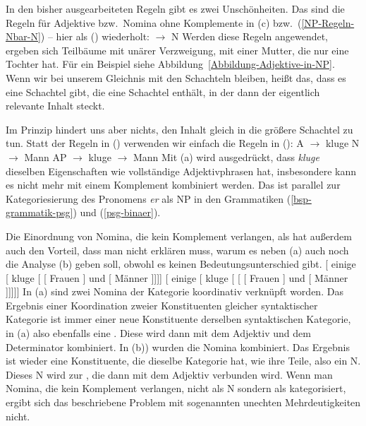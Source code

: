 
In den bisher ausgearbeiteten Regeln gibt es zwei Unschönheiten. Das sind die Regeln für Adjektive
bzw.\ Nomina ohne Komplemente in (c) bzw.\ (\ref{NP-Regeln-Nbar-N}) --  hier als () wiederholt:
\ea
\nbar $\to$ N
\z
Werden diese Regeln angewendet, ergeben sich Teilbäume mit unärer Verzweigung, \dash mit einer Mutter,
die nur eine Tochter hat. Für ein Beispiel siehe Abbildung~\ref{Abbildung-Adjektive-in-NP}. Wenn wir
bei unserem Gleichnis mit den Schachteln bleiben, heißt das, dass es eine Schachtel gibt, die eine
Schachtel enthält, in der dann der eigentlich relevante Inhalt steckt. 

Im Prinzip hindert uns aber nichts, den Inhalt gleich in die größere Schachtel zu tun. Statt der
Regeln in () verwenden wir einfach die Regeln in ():
\eal
\ex A $\to$ kluge
\ex N $\to$ Mann
\zl
\eal
\label{Lexikon-Projektion}
\ex AP $\to$ kluge
\ex \nbar $\to$ Mann
\zl
Mit (a) wird ausgedrückt, dass \emph{kluge} dieselben Eigenschaften wie vollständige
Adjektivphrasen hat, insbesondere kann es nicht mehr mit einem Komplement kombiniert werden. Das ist
parallel zur Kategoriesierung des Pronomens \emph{er} als NP in den Grammatiken
(\ref{bsp-grammatik-psg}) und (\ref{psg-binaer}).


Die Einordnung von Nomina, die kein Komplement verlangen, als \nbar hat außerdem auch den Vorteil,
dass man nicht erklären muss, warum es neben (a) auch noch die Analyse (b) geben soll, obwohl es
keinen Bedeutungsunterschied gibt.
\eal
\ex {}[ einige [\sub{\nbar} kluge [\sub{\nbar} [\sub{\nbar} Frauen ] und [\sub{\nbar} Männer
]]]]
\ex {}[ einige [\sub{\nbar} kluge [\sub{\nbar} [ [ Frauen ] und [ Männer
]]]]]
\zl
In (a) sind zwei Nomina der Kategorie \nbar koordinativ verknüpft worden. Das Ergebnis einer
Koordination zweier Konstituenten gleicher syntaktischer Kategorie ist immer einer neue Konstituente
derselben syntaktischen Kategorie, in (a) also ebenfalls eine \nbar. Diese wird dann mit dem
Adjektiv und dem Determinator kombiniert.
In (b)) wurden die Nomina kombiniert. Das Ergebnis ist wieder eine Konstituente, die dieselbe
Kategorie hat, wie ihre Teile, also ein N. Dieses N wird zur \nbar, die dann mit dem Adjektiv
verbunden wird. Wenn man Nomina, die kein Komplement verlangen, nicht als N sondern als \nbar
kategorisiert, ergibt sich das beschriebene Problem mit sogenannten unechten Mehrdeutigkeiten
nicht. 

\fi

